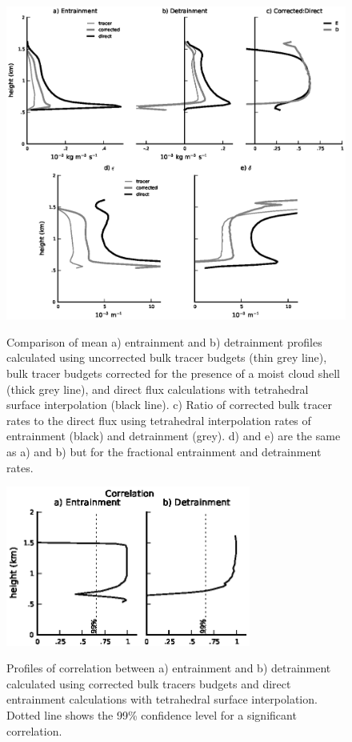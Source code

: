 \documentclass[12pt]{article}
\begin{document}
\begin{figure}[t]
  \noindent\includegraphics[width=40pc,angle=0]{./figures/corrected_entrainment_core.eps}\\
  \caption{Comparison of mean a) entrainment and b) detrainment profiles 
calculated using uncorrected bulk tracer budgets (thin grey line), bulk tracer 
budgets corrected for the presence of a moist cloud shell (thick grey line), and
direct flux calculations with tetrahedral surface interpolation (black line).
c) Ratio of corrected bulk tracer rates to the direct flux using
tetrahedral interpolation rates of entrainment (black) and detrainment (grey).
d) and e) are the same as a) and b) but for the fractional entrainment and
detrainment rates.}\label{fig:corrected_entrainment}
\end{figure}


\begin{figure}[t]
  \noindent\includegraphics[width=19pc,angle=0]{./figures/correlations_core.eps}\\
  \caption{Profiles of correlation between a) entrainment and b) detrainment
calculated using corrected bulk tracers budgets and direct entrainment 
calculations with tetrahedral surface interpolation.  Dotted line shows the 
99\% confidence level for a significant correlation.}\label{fig:correlations}
\end{figure}
\end{document}
